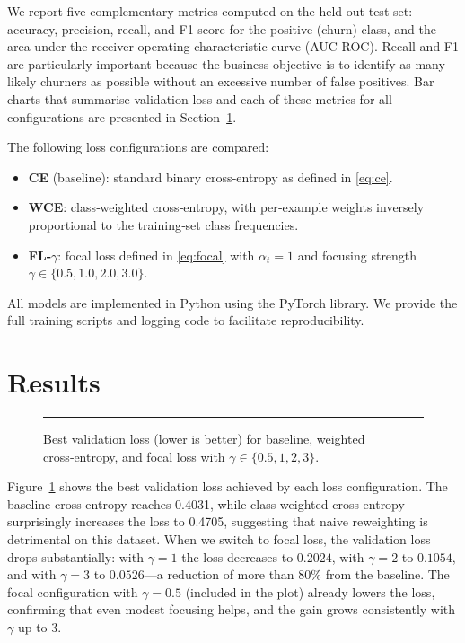 \documentclass[11pt,a4paper]{article}
\begin{document}
We report five complementary metrics computed on the held‑out test set: accuracy, precision, recall, and F1 score for the positive (churn) class, and the area under the receiver operating characteristic curve (AUC‑ROC).
Recall and F1 are particularly important because the business objective is to identify as many likely churners as possible without an excessive number of false positives.
Bar charts that summarise validation loss and each of these metrics for all configurations are presented in Section~\ref{sec:results}.

The following loss configurations are compared:
\begin{itemize}
\item \textbf{CE} (baseline): standard binary cross‑entropy as defined in \eqref{eq:ce}.
\item \textbf{WCE}: class‑weighted cross‑entropy, with per‑example weights inversely proportional to the training‑set class frequencies.
\item \textbf{FL‑$\gamma$}: focal loss defined in \eqref{eq:focal} with $\alpha_t = 1$ and focusing strength $\gamma \in \{0.5, 1.0, 2.0, 3.0\}$.
\end{itemize}

All models are implemented in Python using the PyTorch library.
We provide the full training scripts and logging code to facilitate reproducibility.

\section{Results}
\label{sec:results}

\begin{figure}[H]
\centering
\rule{0.65\textwidth}{3cm}
\caption{Best validation loss (lower is better) for baseline, weighted cross‑entropy, and focal loss with $\gamma\in\{0.5,1,2,3\}$.}
\label{fig:best_val_loss}
\end{figure}

Figure~\ref{fig:best_val_loss} shows the best validation loss achieved by each loss configuration.
The baseline cross‑entropy reaches 0.4031, while class‑weighted cross‑entropy surprisingly increases the loss to 0.4705, suggesting that naive reweighting is detrimental on this dataset.
When we switch to focal loss, the validation loss drops substantially:
with $\gamma = 1$ the loss decreases to $0.2024$, with $\gamma = 2$ to $0.1054$, and with $\gamma = 3$ to $0.0526$---a reduction of more than $80\%$ from the baseline.
The focal configuration with $\gamma = 0.5$ (included in the plot) already lowers the loss, confirming that even modest focusing helps, and the gain grows consistently with $\gamma$ up to 3.
\end{document}
